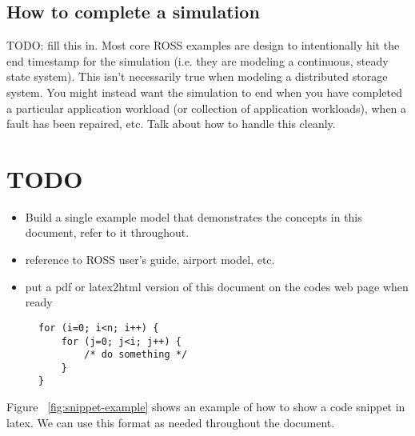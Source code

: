 \documentclass[conference,10pt,compsocconf,onecolumn]{IEEEtran}
\begin{document}
\subsection{How to complete a simulation}

TODO: fill this in.  Most core ROSS examples are design to intentionally hit
the end timestamp for the simulation (i.e. they are modeling a continuous,
steady state system).  This isn't necessarily true when modeling a
distributed storage system.  You might instead want the simulation to end
when you have completed a particular application workload (or collection of
application workloads), when a fault has been repaired, etc.  Talk about how
to handle this cleanly.

\section{TODO}

\begin{itemize}
\item Build a single example model that demonstrates the concepts in this
document, refer to it throughout.
\item reference to ROSS user's guide, airport model, etc.
\item put a pdf or latex2html version of this document on the codes web page
when ready
\end{itemize}

\begin{figure}
\begin{lstlisting}[caption=Example code snippet., label=snippet-example]
for (i=0; i<n; i++) {
    for (j=0; j<i; j++) {
        /* do something */
    }
}
\end{lstlisting}
\end{figure}

Figure ~\ref{fig:snippet-example} shows an example of how to show a code
snippet in latex.  We can use this format as needed throughout the document.
\end{document}
